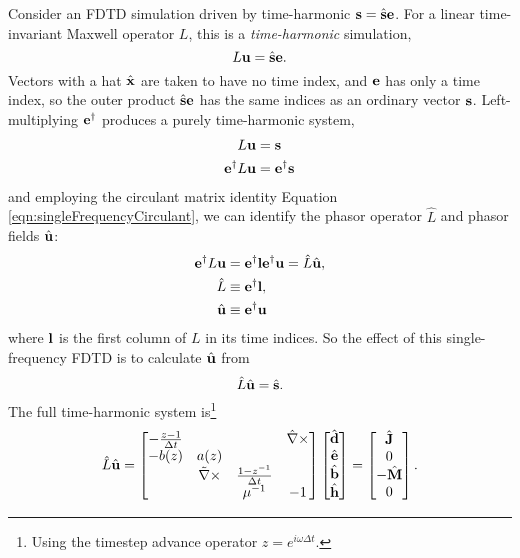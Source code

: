 Consider an FDTD simulation driven by time-harmonic $\textbf{s} = \hat{\textbf{s}} \textbf{e}$.  For a linear time-invariant Maxwell operator $L$, this is a \emph{time-harmonic} simulation,
%
\begin{equation}
L \textbf{u} = \hat{\textbf{s}} \textbf{e}.
\end{equation}
%
Vectors with a hat $\hat{\textbf{x}}$ are taken to have no time index, and $\textbf{e}$ has only a time index, so the outer product $\hat{\textbf{s}} \textbf{e}$ has the same indices as an ordinary vector $\textbf{s}$.  Left-multiplying $\textbf{e}^\dagger$ produces a purely time-harmonic system,
%
\begin{equation}
\begin{aligned}
L \textbf{u} &= \textbf{s} \\
\textbf{e}^\dagger L \textbf{u} &= \textbf{e}^\dagger \textbf{s} \\
\end{aligned}
\end{equation}
%
and employing the circulant matrix identity Equation \ref{eqn:singleFrequencyCirculant}, we can identify the phasor operator $\hat L$ and phasor fields $\hat{\textbf{u}}$:
%
\begin{equation}
\begin{aligned}
\textbf{e}^\dagger L \textbf{u} &= \textbf{e}^\dagger \textbf{l} \textbf{e}^\dagger \textbf{u} = \hat{L} \hat{\textbf{u}}, \\
\hat L &\equiv \textbf{e}^\dagger \textbf{l}, \\
\hat{\textbf{u}} &\equiv \textbf{e}^\dagger \textbf{u}
\end{aligned}
\end{equation}
%
where $\textbf{l}$ is the first column of $L$ in its time indices.  So the effect of this single-frequency FDTD is to calculate $\hat{\textbf{u}}$ from
%
\begin{equation}
\hat{L} \hat{\textbf{u}} = \hat{\textbf{s}}.
\end{equation}
%
The full time-harmonic system is\footnote{Using the timestep advance operator $z = e^{i \omega \Delta t}$.}
%
\begin{equation}
\hat{L} \hat{\textbf{u}} =
\begin{bmatrix}
-\frac{z-1}{\Delta t} & & & \hat{\nabla} \times \\
-b(z) & a(z) & & \\
& \tilde{\nabla} \times & \frac{1 - z^{-1}}{\Delta t} & \\
& & \mu^{-1} & -1
\end{bmatrix}
\begin{bmatrix}
\hat{\textbf{d}} \\ \hat{\textbf{e}} \\ \hat{\textbf{b}} \\ \hat{\textbf{h}}
\end{bmatrix}
=
\begin{bmatrix}
\hat{\textbf{J}} \\ 0 \\ -\hat{\textbf{M}} \\ 0 
\end{bmatrix}.
\end{equation}
